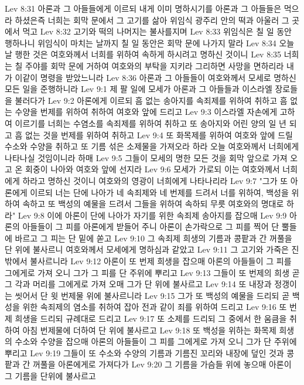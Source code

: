 Lev 8:31  아론과 그 아들들에게 이르되 내게 이미 명하시기를 아론과 그 아들들은 먹으라 하셨은즉 너희는 회막 문에서 그 고기를 삶아 위임식 광주리 안의 떡과 아울러 그 곳에서 먹고
Lev 8:32  고기와 떡의 나머지는 불사를지며
Lev 8:33  위임식은 칠 일 동안 행하나니 위임식이 마치는 날까지 칠 일 동안은 회막 문에 나가지 말라
Lev 8:34  오늘날 행한 것은 여호와께서 너희를 위하여 속하게 하시려고 명하신 것이니
Lev 8:35  너희는 칠 주야를 회막 문에 거하여 여호와의 부탁을 지키라 그리하면 사망을 면하리라 내가 이같이 명령을 받았느니라
Lev 8:36  아론과 그 아들들이 여호와께서 모세로 명하신 모든 일을 준행하니라
Lev 9:1  제 팔 일에 모세가 아론과 그 아들들과 이스라엘 장로들을 불러다가
Lev 9:2  아론에게 이르되 흠 없는 송아지를 속죄제를 위하여 취하고 흠 없는 수양을 번제를 위하여 취하여 여호와 앞에 드리고
Lev 9:3  이스라엘 자손에게 고하여 이르기를 너희는 수염소를 속죄제를 위하여 취하고 또 송아지와 어린 양의 일 년 되고 흠 없는 것을 번제를 위하여 취하고
Lev 9:4  또 화목제를 위하여 여호와 앞에 드릴 수소와 수양을 취하고 또 기름 섞은 소제물을 가져오라 하라 오늘 여호와께서 너희에게 나타나실 것임이니라 하매
Lev 9:5  그들이 모세의 명한 모든 것을 회막 앞으로 가져 오고 온 회중이 나아와 여호와 앞에 선지라
Lev 9:6  모세가 가로되 이는 여호와께서 너희에게 하라고 명하신 것이니 여호와의 영광이 너희에게 나타나리라
Lev 9:7  "그가 또 아론에게 이르되 너는 단에 나아가 네 속죄제와 네 번제를 드려서 너를 위하여, 백성을 위하여 속하고 또 백성의 예물을 드려서 그들을 위하여 속하되 무릇 여호와의 명대로 하라"
Lev 9:8  이에 아론이 단에 나아가 자기를 위한 속죄제 송아지를 잡으매
Lev 9:9  아론의 아들들이 그 피를 아론에게 받들어 주니 아론이 손가락으로 그 피를 찍어 단 뿔들에 바르고 그 피는 단 밑에 쏟고
Lev 9:10  그 속죄제 희생의 기름과 콩팥과 간 꺼풀을 단 위에 불사르니 여호와께서 모세에게 명하심과 같았고
Lev 9:11  그 고기와 가죽은 진 밖에서 불사르니라
Lev 9:12  아론이 또 번제 희생을 잡으매 아론의 아들들이 그 피를 그에게로 가져 오니 그가 그 피를 단 주위에 뿌리고
Lev 9:13  그들이 또 번제의 희생 곧 그 각과 머리를 그에게로 가져 오매 그가 단 위에 불사르고
Lev 9:14  또 내장과 정갱이는 씻어서 단 윗 번제물 위에 불사르니라
Lev 9:15  그가 또 백성의 예물을 드리되 곧 백성을 위한 속죄제의 염소를 취하여 잡아 전과 같이 죄를 위하여 드리고
Lev 9:16  또 번제 희생을 드리되 규례대로 드리고
Lev 9:17  또 소제를 드리되 그 중에서 한 움큼을 취하여 아침 번제물에 더하여 단 위에 불사르고
Lev 9:18  또 백성을 위하는 화목제 희생의 수소와 수양을 잡으매 아론의 아들들이 그 피를 그에게로 가져 오니 그가 단 주위에 뿌리고
Lev 9:19  그들이 또 수소와 수양의 기름과 기름진 꼬리와 내장에 덮인 것과 콩팥과 간 꺼풀을 아론에게로 가져다가
Lev 9:20  그 기름을 가슴들 위에 놓으매 아론이 그 기름을 단위에 불사르고
